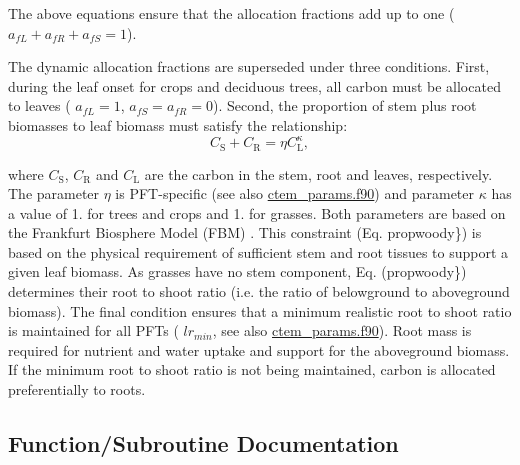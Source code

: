 The above equations ensure that the allocation fractions add up to one ( $a_{fL} + a_{fR} + a_{fS} = 1$).

The dynamic allocation fractions are superseded under three conditions. First, during the leaf onset for crops and deciduous trees, all carbon must be allocated to leaves ( $a_{fL} = 1$, $a_{fS} = a_{fR} = 0$). Second, the proportion of stem plus root biomasses to leaf biomass must satisfy the relationship\+: \[ \label{propwoody} C_\mathrm{S} + C_\mathrm{R} = \eta C_\mathrm{L}^{\kappa},\]

where $C_\mathrm{S}$, $C_\mathrm{R}$ and $C_\mathrm{L}$ are the carbon in the stem, root and leaves, respectively. The parameter $\eta$ is P\+F\+T-\/specific (see also \hyperlink{ctem__params_8f90}{ctem\+\_\+params.\+f90}) and parameter $\kappa$ has a value of 1. for trees and crops and 1. for grasses. Both parameters are based on the Frankfurt Biosphere Model (F\+B\+M) \cite{Ludeke1994-px}. This constraint (Eq. propwoody\}) is based on the physical requirement of sufficient stem and root tissues to support a given leaf biomass. As grasses have no stem component, Eq. (propwoody\}) determines their root to shoot ratio (i.\+e. the ratio of belowground to aboveground biomass). The final condition ensures that a minimum realistic root to shoot ratio is maintained for all P\+F\+Ts ( ${lr}_{min}$, see also \hyperlink{ctem__params_8f90}{ctem\+\_\+params.\+f90}). Root mass is required for nutrient and water uptake and support for the aboveground biomass. If the minimum root to shoot ratio is not being maintained, carbon is allocated preferentially to roots. 

\subsection{Function/\+Subroutine Documentation}
\hypertarget{allocate_8f_aa4327082169256da29b83bf41b489db6}{}
